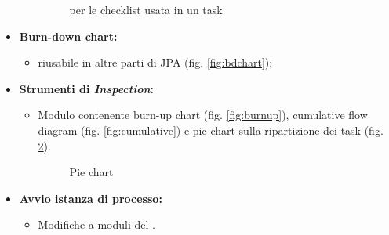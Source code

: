 \begin{itemize}
\begin{itemize}
\begin{figure}[H]
    \caption{ per le checklist usata in un task}
    \label{fig:cl-in-viewer}%
    \end{figure}
  \end{itemize}
\item \textbf{Burn-down chart:}
  \begin{itemize}
  \item {} riusabile in altre parti di JPA (fig.
    \ref{fig:bdchart});
  \end{itemize}
\item \textbf{Strumenti di \emph{Inspection}:}
  \begin{itemize}
  \item Modulo contenente burn-up chart (fig. \ref{fig:burnup}), cumulative
    flow diagram (fig. \ref{fig:cumulative}) e pie chart sulla ripartizione
    dei task (fig. \ref{fig:pies}).
    \begin{figure}[H]
      \vspace*{\fill}
      \caption{Pie chart}
      \label{fig:pies}
    \end{figure}
  \end{itemize}
\item \textbf{Avvio istanza di processo:}
  \begin{itemize}
  \item Modifiche a moduli del \FREND{}.
    \begin{figure}[H]%
    \centering

\end{figure}
\end{itemize}
\end{itemize}

